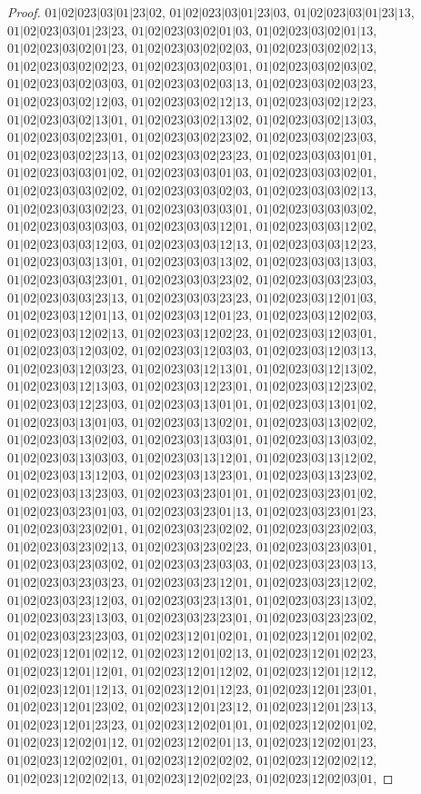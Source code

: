 \documentclass[12pt]{article}
\theoremstyle{plain}
\theoremstyle{definition}
\theoremstyle{remark}
\begin{document}
\begin{proof}
$01|02|023|03|01|23|02$, $01|02|023|03|01|23|03$, $01|02|023|03|01|23|13$, $01|02|023|03|01|23|23$, $01|02|023|03|02|01|03$, $01|02|023|03|02|01|13$, $01|02|023|03|02|01|23$, $01|02|023|03|02|02|03$, $01|02|023|03|02|02|13$, $01|02|023|03|02|02|23$, $01|02|023|03|02|03|01$, $01|02|023|03|02|03|02$, $01|02|023|03|02|03|03$, $01|02|023|03|02|03|13$, $01|02|023|03|02|03|23$, $01|02|023|03|02|12|03$, $01|02|023|03|02|12|13$, $01|02|023|03|02|12|23$, $01|02|023|03|02|13|01$, $01|02|023|03|02|13|02$, $01|02|023|03|02|13|03$, $01|02|023|03|02|23|01$, $01|02|023|03|02|23|02$, $01|02|023|03|02|23|03$, $01|02|023|03|02|23|13$, $01|02|023|03|02|23|23$, $01|02|023|03|03|01|01$, $01|02|023|03|03|01|02$, $01|02|023|03|03|01|03$, $01|02|023|03|03|02|01$, $01|02|023|03|03|02|02$, $01|02|023|03|03|02|03$, $01|02|023|03|03|02|13$, $01|02|023|03|03|02|23$, $01|02|023|03|03|03|01$, $01|02|023|03|03|03|02$, $01|02|023|03|03|03|03$, $01|02|023|03|03|12|01$, $01|02|023|03|03|12|02$, $01|02|023|03|03|12|03$, $01|02|023|03|03|12|13$, $01|02|023|03|03|12|23$, $01|02|023|03|03|13|01$, $01|02|023|03|03|13|02$, $01|02|023|03|03|13|03$, $01|02|023|03|03|23|01$, $01|02|023|03|03|23|02$, $01|02|023|03|03|23|03$, $01|02|023|03|03|23|13$, $01|02|023|03|03|23|23$, $01|02|023|03|12|01|03$, $01|02|023|03|12|01|13$, $01|02|023|03|12|01|23$, $01|02|023|03|12|02|03$, $01|02|023|03|12|02|13$, $01|02|023|03|12|02|23$, $01|02|023|03|12|03|01$, $01|02|023|03|12|03|02$, $01|02|023|03|12|03|03$, $01|02|023|03|12|03|13$, $01|02|023|03|12|03|23$, $01|02|023|03|12|13|01$, $01|02|023|03|12|13|02$, $01|02|023|03|12|13|03$, $01|02|023|03|12|23|01$, $01|02|023|03|12|23|02$, $01|02|023|03|12|23|03$, $01|02|023|03|13|01|01$, $01|02|023|03|13|01|02$, $01|02|023|03|13|01|03$, $01|02|023|03|13|02|01$, $01|02|023|03|13|02|02$, $01|02|023|03|13|02|03$, $01|02|023|03|13|03|01$, $01|02|023|03|13|03|02$, $01|02|023|03|13|03|03$, $01|02|023|03|13|12|01$, $01|02|023|03|13|12|02$, $01|02|023|03|13|12|03$, $01|02|023|03|13|23|01$, $01|02|023|03|13|23|02$, $01|02|023|03|13|23|03$, $01|02|023|03|23|01|01$, $01|02|023|03|23|01|02$, $01|02|023|03|23|01|03$, $01|02|023|03|23|01|13$, $01|02|023|03|23|01|23$, $01|02|023|03|23|02|01$, $01|02|023|03|23|02|02$, $01|02|023|03|23|02|03$, $01|02|023|03|23|02|13$, $01|02|023|03|23|02|23$, $01|02|023|03|23|03|01$, $01|02|023|03|23|03|02$, $01|02|023|03|23|03|03$, $01|02|023|03|23|03|13$, $01|02|023|03|23|03|23$, $01|02|023|03|23|12|01$, $01|02|023|03|23|12|02$, $01|02|023|03|23|12|03$, $01|02|023|03|23|13|01$, $01|02|023|03|23|13|02$, $01|02|023|03|23|13|03$, $01|02|023|03|23|23|01$, $01|02|023|03|23|23|02$, $01|02|023|03|23|23|03$, $01|02|023|12|01|02|01$, $01|02|023|12|01|02|02$, $01|02|023|12|01|02|12$, $01|02|023|12|01|02|13$, $01|02|023|12|01|02|23$, $01|02|023|12|01|12|01$, $01|02|023|12|01|12|02$, $01|02|023|12|01|12|12$, $01|02|023|12|01|12|13$, $01|02|023|12|01|12|23$, $01|02|023|12|01|23|01$, $01|02|023|12|01|23|02$, $01|02|023|12|01|23|12$, $01|02|023|12|01|23|13$, $01|02|023|12|01|23|23$, $01|02|023|12|02|01|01$, $01|02|023|12|02|01|02$, $01|02|023|12|02|01|12$, $01|02|023|12|02|01|13$, $01|02|023|12|02|01|23$, $01|02|023|12|02|02|01$, $01|02|023|12|02|02|02$, $01|02|023|12|02|02|12$, $01|02|023|12|02|02|13$, $01|02|023|12|02|02|23$, $01|02|023|12|02|03|01$, 
\end{proof}
\end{document}
